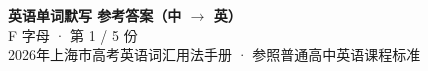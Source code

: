 \documentclass[10pt,a4paper]{article}
\begin{document}
\pagestyle{plain}

\begin{center}
{\LARGE\bfseries 英语单词默写 \quad 参考答案（中 $\to$ 英）}\\[0.22em]
{\large F 字母 · 第 1 / 5 份}\\[0.18em]
{\small 2026年上海市高考英语词汇用法手册 · 参照普通高中英语课程标准}
\end{center}

\vspace{0.2em}
\noindent{\color{rulegray}\rule{\textwidth}{0.8pt}}

\vspace{0.35em}

\vspace{0.25em}
\renewcommand{\arraystretch}{1.32}
\end{document}
